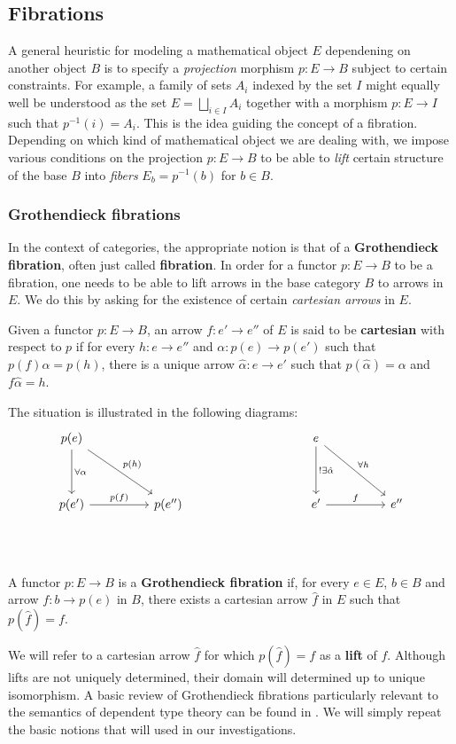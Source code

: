 \subsection{Fibrations}
A general heuristic for modeling a mathematical object $E$ dependening on another object $B$ is to specify a \textit{projection} morphism $p : E \to B$ subject to certain constraints. For example, a family of sets $A_i$ indexed by the set $I$ might equally well be understood as the set $E = \bigsqcup_{i \in I}A_i$ together with a morphism $p : E  \to I$ such that $p^{-1}(i) = A_i$. This is the idea guiding the concept of a fibration. Depending on which kind of mathematical object we are dealing with, we impose various conditions on the projection $p : E \to B$ to be able to \textit{lift} certain structure of the base $B$ into \textit{fibers} $E_b = p^{-1}(b)$ for $b \in B$.

\subsubsection{Grothendieck fibrations}
In the context of categories, the appropriate notion is that of a \textbf{Grothendieck fibration}, often just called \textbf{fibration}. In order for a functor $p : E \to B$ to be a fibration, one needs to be able to lift arrows in the base category $B$ to arrows in $E$. We do this by asking for the existence of certain \textit{cartesian arrows} in $E$.
\begin{defn}
Given a functor $p : E \to B$, an arrow $f : e' \to e''$ of $E$ is said to be \textbf{cartesian} with respect to $p$ if for every $h : e \to e''$ and $\alpha : p(e) \to p(e')$ such that $p(f)\alpha = p(h)$, there is a unique arrow $\hat \alpha : e \to e'$ such that $p(\hat \alpha) = \alpha$ and $f \hat \alpha = h$.
\end{defn}
The situation is illustrated in the following diagrams:
\[
\ti
p(e) \ar[d, "\forall \alpha"] \ar[dr, "p(h)"] & & & e \ar[d, "!\exists \hat \alpha"] \ar[dr, "\forall h"] \\
p(e') \ar[r, "p(f)"] & p(e'') & & e' \ar[r, "f"] & e''\\
\kz
\]
\begin{defn}
A functor $p: E \to B$ is a \textbf{Grothendieck fibration} if, for every $e \in E$, $b \in B$ and arrow $f : b \to p(e)$ in $B$, there exists a cartesian arrow $\hat f$ in $E$ such that $p(\hat f) = f$.
\end{defn}
We will refer to a cartesian arrow $\hat f$ for which $p(\hat f) = f$ as a \textbf{lift} of $f$. Although lifts are not uniquely determined, their domain will determined up to unique isomorphism.
A basic review of Grothendieck fibrations particularly relevant to the semantics of dependent type theory can be found in \cite{jacobs}. We will simply repeat the basic notions that will used in our investigations.
\\

